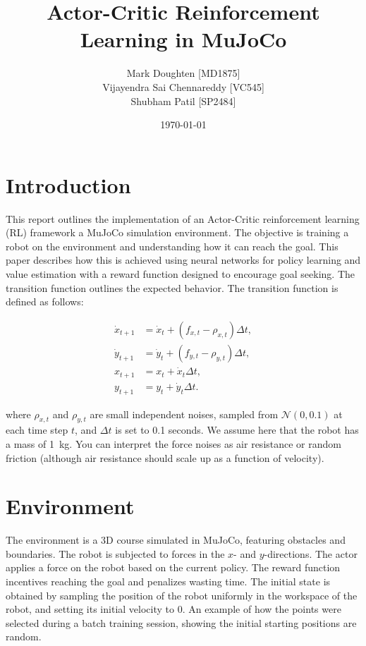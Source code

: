 \documentclass[12pt]{article}
\title{Actor-Critic Reinforcement Learning in MuJoCo}
\author{
    Mark Doughten [MD1875] \\
    Vijayendra Sai Chennareddy [VC545] \\
    Shubham Patil [SP2484]
}
\date{\today}
\begin{document}
\maketitle

\section{Introduction}
This report outlines the implementation of an Actor-Critic reinforcement learning (RL) framework a MuJoCo simulation environment. The objective is training a robot on the environment and understanding how it can reach the goal. This paper describes how this is achieved using neural networks for policy learning and value estimation with a reward function designed to encourage goal seeking. The transition function outlines the expected behavior. The transition function is defined as follows:

\begin{align*}
\dot{x}_{t+1} &= \dot{x}_t + (f_{x,t} - \rho_{x,t}) \Delta t, \\
\dot{y}_{t+1} &= \dot{y}_t + (f_{y,t} - \rho_{y,t}) \Delta t, \\
x_{t+1} &= x_t + \dot{x}_t \Delta t, \\
y_{t+1} &= y_t + \dot{y}_t \Delta t.
\end{align*}

where \( \rho_{x,t} \) and \( \rho_{y,t} \) are small independent noises, sampled from \( \mathcal{N}(0, 0.1) \) at each time step \( t \), and \( \Delta t \) is set to 0.1 seconds. We assume here that the robot has a mass of 1~kg. You can interpret the force noises as air resistance or random friction (although air resistance should scale up as a function of velocity).

\section{Environment}
The environment is a 3D course simulated in MuJoCo, featuring obstacles and boundaries. The robot is subjected to forces in the \(x\)- and \(y\)-directions. The actor applies a force on the robot based on the current policy. The reward function incentives reaching the goal and penalizes wasting time. The initial state is obtained by sampling the
position of the robot uniformly in the workspace of the robot, and setting
its initial velocity to 0. An example of how the points were selected during a batch training session, showing the initial starting positions are random. 
\end{document}

